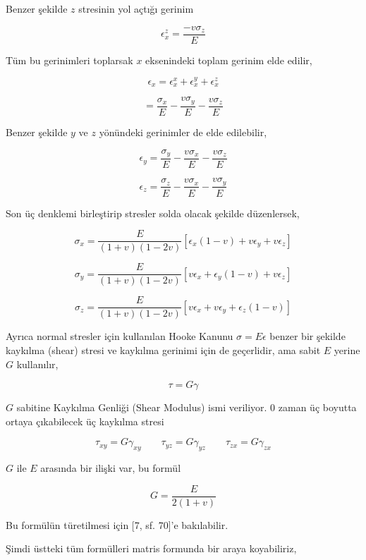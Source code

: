 \documentclass[12pt,fleqn]{article}\usepackage{../../common}
\begin{document}
Benzer şekilde $z$ stresinin yol açtığı gerinim

$$
\epsilon_x^z =  \frac{- v \sigma_z}{E}
$$

Tüm bu gerinimleri toplarsak $x$ eksenindeki toplam gerinim elde edilir,

$$
\epsilon_x = \epsilon_x^x + \epsilon_x^y + \epsilon_x^z
$$

$$
= \frac{\sigma_x}{E} - \frac{v \sigma_y}{E} - \frac{v \sigma_z}{E} 
$$

Benzer şekilde $y$ ve $z$ yönündeki gerinimler de elde edilebilir,

$$
\epsilon_y = \frac{\sigma_y}{E} - \frac{v \sigma_x}{E} - \frac{v \sigma_z}{E} 
$$

$$
\epsilon_z = \frac{\sigma_z}{E} - \frac{v \sigma_x}{E} - \frac{v \sigma_y}{E} 
$$

Son üç denklemi birleştirip stresler solda olacak şekilde düzenlersek,

$$
\sigma_x = \frac{E}{(1+v)(1-2v)} [\epsilon_x (1-v) + v \epsilon_y + v \epsilon_z ]
$$

$$
\sigma_y = \frac{E}{(1+v)(1-2v)} [ v \epsilon_x + \epsilon_y (1-v) + v \epsilon_z  ]
$$

$$
\sigma_z = \frac{E}{(1+v)(1-2v)} [v \epsilon_x + v \epsilon_y + \epsilon_z (1-v)  ]
$$

Ayrıca normal stresler için kullanılan Hooke Kanunu $\sigma = E \epsilon$ benzer
bir şekilde kaykılma (shear) stresi ve kaykılma gerinimi için de geçerlidir, ama
sabit $E$ yerine $G$ kullanılır,

$$
\tau = G \gamma
$$

$G$ sabitine Kaykılma Genliği (Shear Modulus) ismi veriliyor. 0 zaman üç boyutta
ortaya çıkabilecek üç kaykılma stresi

$$
\tau_{xy} = G \gamma_{xy} \qquad 
\tau_{yz} = G \gamma_{yz} \qquad 
\tau_{zx} = G \gamma_{zx}
$$

$G$ ile $E$ arasında bir ilişki var, bu formül

$$
G = \frac{E}{2(1+v)}
$$

Bu formülün türetilmesi için [7, sf. 70]'e bakılabilir.

Şimdi üstteki tüm formülleri matris formunda bir araya koyabiliriz,
\end{document}
